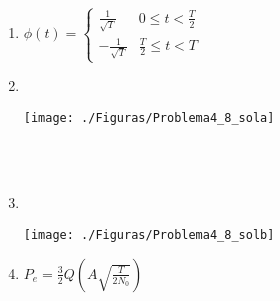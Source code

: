 \documentclass[es,boletin]{uah}
\begin{document}
{

\begin{enumerate}
	\item $\phi(t) = \left \{ \begin{array}{ll} \frac{1}{\sqrt{T}} & 0 \leq t < \frac{T}{2} \\  -\frac{1}{\sqrt{T}} & \frac{T}{2} \leq t < T \end{array} \right.$
	
	\item \ \\
	\begin{figure*}[h!] \centering\texttt{[image: ./Figuras/Problema4\_8\_sola]}	\end{figure*}
	
	\ \\
	\ \\
	\item \ \\
	\begin{figure*}[h!] 	\centering\texttt{[image: ./Figuras/Problema4\_8\_solb]} 	\end{figure*}
	
	\item $P_e = \frac{3}{2} Q \left ( A \sqrt{\frac{T}{2N_0}} \right ) $
	
\end{enumerate}

}
\end{document}
